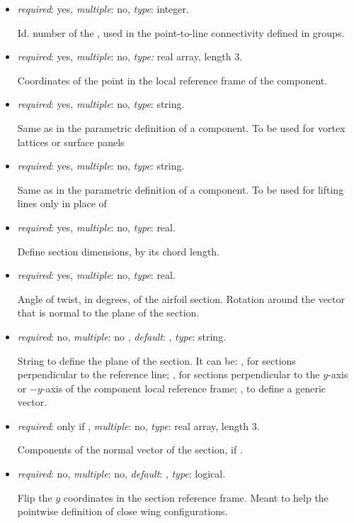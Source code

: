 \begin{itemize}

\item {} \textit{required}: yes, \textit{multiple}: no, \textit{type}: integer.

    Id. number of the , used in the point-to-line connectivity defined in  groups.

\item {}  \textit{required}: yes, \textit{multiple}: no, \textit{type:} real array, length 3.

    Coordinates of the point in the local reference frame of the component.
    
\item {}  \textit{required}: yes, \textit{multiple}: no, \textit{type}: string.

    Same as in the parametric definition of a component. To be used for vortex lattices or surface panels
    
\item {}  \textit{required}: yes, \textit{multiple}: no, \textit{type}: string.

    Same as in the parametric definition of a component. To be used for lifting lines only in place of 

\item {}  \textit{required}: yes, \textit{multiple}: no, \textit{type}: real.

    Define section dimensions, by its chord length.

\item {}  \textit{required}: yes, \textit{multiple}: no, \textit{type}: real.

    Angle of twist, in degrees, of the airfoil section. Rotation around the vector that is normal to the plane of the section.

\item {} \textit{required}: no, \textit{multiple}: no , \textit{default}:  , \textit{type}: string.

    String to define the plane of the section. It can be: , for sections perpendicular to the reference line; ,  for sections perpendicular to the $y$-axis or $-y$-axis of the component local reference frame; , to define a generic vector. 

\item {} \textit{required}: only if , \textit{multiple}: no, \textit{type}: real array, length 3.

    Components of the normal vector of the section, if .

\item {} \textit{required}: no, \textit{multiple}: no, \textit{default}:  , \textit{type}: logical.

   Flip the $y$ coordinates in the section reference frame. Meant to help the pointwise definition of close wing configurations.

\end{itemize}
